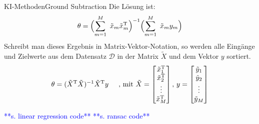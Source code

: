 \documentclass[169, handout	]{THIbeamer} %
\begin{document}
\begin{frame}{KI-Methoden}{Ground Subtraction}
	Die Lösung ist:
	\begin{equation}
		\theta = \Bigl( \sum_{m=1}^M\ \tilde{x}_m \tilde{x}_m^{\text{T}} \Bigr)^{-1} \Bigl( \sum_{m=1}^M\ \tilde{x}_m y_m \Bigr)
	\end{equation}
	Schreibt man dieses Ergebnis in Matrix-Vektor-Notation, so werden alle Eingänge und Zielwerte aus dem Datensatz $\mathcal{D}$ in der Matrix $\tilde{X}$ und dem Vektor $y$ sortiert. 
	\begin{equation}
		\theta = ( \tilde{X}^{\text{T}} \tilde{X} )^{-1} \tilde{X}^{\text{T}} y
		\hspace{0.5 cm}	
		\text{, mit }			
		\tilde{X} = 
		\begin{bmatrix}
			\tilde{x}_1^{\text{T}} \\
			\tilde{x}_2^{\text{T}} \\	
			\vdots \\
			\tilde{x}_M^{\text{T}} \\		
		\end{bmatrix}
		\text{,  }
		y =	
		\begin{bmatrix}
			\tilde{y}_1 \\
			\tilde{y}_2 \\	
			\vdots \\
			\tilde{y}_M \\
		\end{bmatrix}						
	\end{equation}

\textcolor{blue}{**s. linear regression code**} \textcolor{blue}{**s. ransac code**}
\end{frame}
\end{document}
